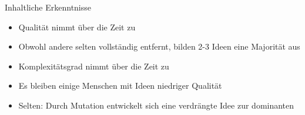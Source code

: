 \begin{frame} {Inhaltliche Erkenntnisse}
	\begin{itemize}
		\item Qualität nimmt über die Zeit zu
		\item Obwohl andere selten vollständig entfernt, bilden 2-3 Ideen eine Majorität aus
		\item Komplexitätsgrad nimmt über die Zeit zu
		\item Es bleiben einige Menschen mit Ideen niedriger Qualität
		\item Selten: Durch Mutation entwickelt sich eine verdrängte Idee zur dominanten
	\end{itemize}
\end{frame}
